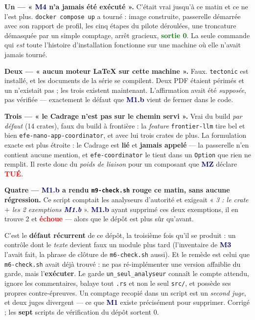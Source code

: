 \documentclass[10pt]{article}
\newcommand{\best}[1]{\textcolor{green}{\textbf{#1}}}
\newcommand{\pire}[1]{\textcolor{red}{\textbf{#1}}}
\newcommand{\code}[1]{\texttt{\small #1}}
\newcommand{\mm}[1]{\textbf{\textcolor{navy}{#1}}}
\begin{document}
\begin{alerte}
\textbf{Un --- « \mm{M4} n'a jamais été exécuté ».} C'était vrai jusqu'à ce matin et ce ne l'est plus.
\code{docker compose up} a tourné : image construite, passerelle démarrée avec son rapport de profil,
les cinq étapes du pilote déroulées, une troncature démasquée par un simple comptage, arrêt gracieux,
\best{sortie 0}. La seule commande qui \emph{est} toute l'histoire d'installation fonctionne sur une
machine où elle n'avait jamais tourné.

\textbf{Deux --- « aucun moteur \LaTeX{} sur cette machine ».} Faux. \code{tectonic} est installé, et
les documents de la série se compilent. Deux PDF étaient périmés et un n'existait pas ; les trois
existent maintenant. L'affirmation avait été \emph{supposée}, pas vérifiée --- exactement le défaut
que \mm{M1.b} vient de fermer dans le code.

\textbf{Trois --- « le Cadrage n'est pas sur le chemin servi ».} Vrai du build \emph{par défaut}
(14 crates), faux du build à frontière : la \emph{feature} \code{frontier-llm} tire bel et bien
\code{efe-nano-app-coordinator}, et avec lui trois crates de plus. La formulation exacte est plus
étroite : le Cadrage est \textbf{lié} et \textbf{jamais appelé} --- la passerelle n'en contient
aucune mention, et \code{efe-coordinator} le tient dans un \code{Option} que rien ne remplit. Il
reste donc du \emph{poids de liaison} pour un composant que \mm{MZ} déclare \pire{TUÉ}.
\end{alerte}

\begin{alerte}
\textbf{Quatre --- \mm{M1.b} a rendu \code{m9-check.sh} rouge ce matin, sans aucune régression.} Ce
script comptait les analyseurs d'autorité et exigeait « \emph{3 : le crate $+$ les 2 exemptions
\mm{M1.b}} ». \mm{M1.b} ayant supprimé ces deux exemptions, il en trouve 2 et \pire{échoue} --- alors
que le dépôt est plus sûr qu'avant.

C'est le \textbf{défaut récurrent} de ce dépôt, la troisième fois qu'il se produit : un contrôle dont
le \emph{texte} devient faux un module plus tard (l'inventaire de \mm{M3} l'avait fait, la phrase de
clôture de \code{m6-check.sh} aussi). Et le remède est celui que \code{m6-check.sh} avait déjà
trouvé : ne pas ré-implémenter une version affaiblie du garde, mais l'\textbf{exécuter}. Le garde
\code{un\_seul\_analyseur} connaît le compte attendu, ignore les commentaires, balaye tout \code{.rs}
et non le seul \code{src/}, et possède ses propres contre-épreuves. Un comptage recopié dans un
script est un \emph{second juge}, et deux juges divergent --- ce que \mm{M1} existe précisément pour
supprimer. Corrigé ; les \textbf{sept} scripts de vérification du dépôt sortent 0.
\end{alerte}
\end{document}
